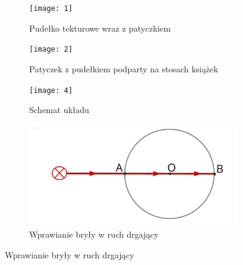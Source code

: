 \documentclass[]{article}
\begin{document}
\begin{figure}[h!]
  \centering
  \begin{subfigure}[b]{0.4\linewidth}
    \texttt{[image: 1]}
    \caption{Pudełko tekturowe wraz z patyczkiem}
  \end{subfigure}
  \begin{subfigure}[b]{0.4\linewidth}
    \texttt{[image: 2]}
    \caption{Patyczek z pudełkiem podparty na stosach książek}
  \end{subfigure}
  \begin{subfigure}[b]{0.4\linewidth}
    \texttt{[image: 4]}
    \caption{Schemat układu}
  \end{subfigure}
  \begin{subfigure}[b]{0.4\linewidth}
    \includegraphics[width=\linewidth]{3}
    \caption{Wprawianie bryły w ruch drgający}
  \end{subfigure}
  
\end{figure}



	
	
	


	
\end{document}
